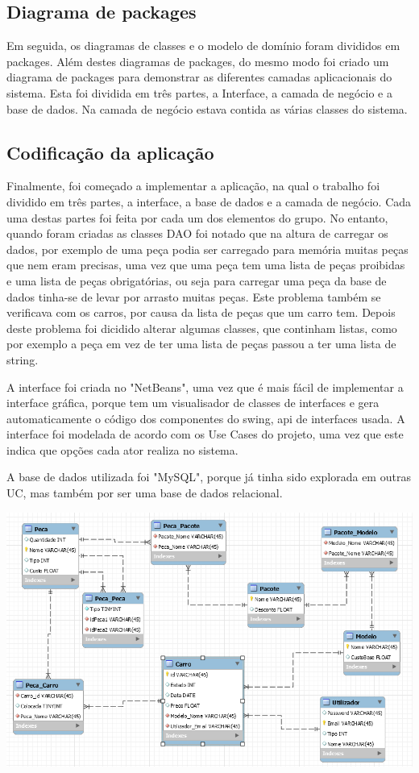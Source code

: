 \documentclass[10pt, a4paper]{article}
\begin{document}
\subsection{Diagrama de packages}
Em seguida, os diagramas de classes e o modelo de domínio foram divididos em packages. Além destes diagramas de packages, do mesmo modo foi criado um diagrama de packages para demonstrar as diferentes camadas aplicacionais do sistema. Esta foi dividida em três partes, a Interface, a camada de negócio e a base de dados. Na camada de negócio estava contida as várias classes do sistema.
\subsection{Codificação da aplicação}
Finalmente, foi começado a implementar a aplicação, na qual o trabalho foi dividido em três partes, a interface, a base de dados e a camada de negócio. Cada uma destas partes foi feita por cada um dos elementos do grupo. No entanto, quando foram criadas as classes DAO foi notado que na altura de carregar os dados, por exemplo de uma peça podia ser carregado para memória muitas peças que nem eram precisas, uma vez que uma peça tem uma lista de peças proibidas e uma lista de peças obrigatórias, ou seja para carregar uma peça da base de dados tinha-se de levar por arrasto muitas peças. Este problema também se verificava com os carros, por causa da lista de peças que um carro tem. Depois deste problema foi dicidido alterar algumas classes, que continham listas, como por exemplo a peça em vez de ter uma lista de peças passou a ter uma lista de string.

A interface foi criada no "NetBeans", uma vez que é mais fácil de implementar a interface gráfica, porque tem um visualisador de classes de interfaces e gera automaticamente o código dos componentes do swing, api de interfaces usada. A interface foi modelada de acordo com os Use Cases do projeto, uma vez que este indica que opções cada ator realiza no sistema.

A base de dados utilizada foi  "MySQL", porque já tinha sido explorada em outras UC, mas também por ser uma base de dados relacional.

\includegraphics{EsquemaFisico}
\end{document}
